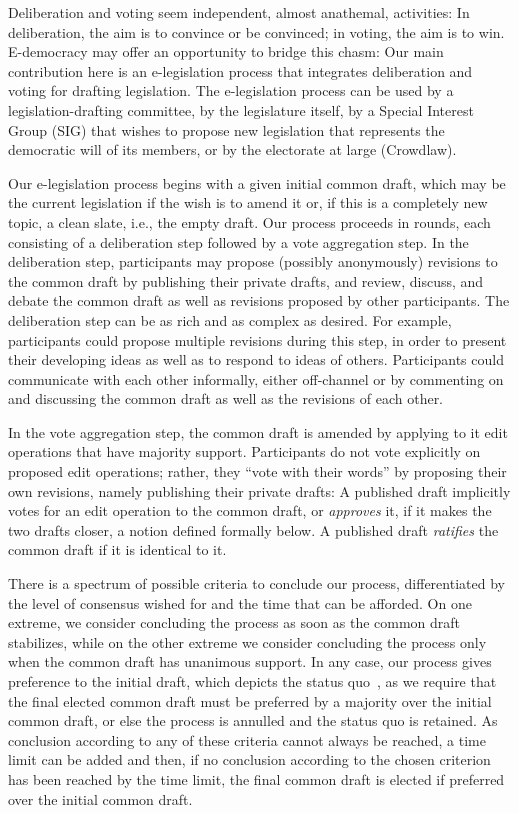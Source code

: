 \documentclass{llncs}
\begin{document}
Deliberation and voting seem independent, almost anathemal, activities: In deliberation, the aim is to convince or be convinced; in voting, the aim is to win.  E-democracy may offer an opportunity to bridge this chasm: Our main contribution here is an e-legislation process that integrates deliberation and voting for drafting legislation. The e-legislation process can be used by a legislation-drafting committee, by the legislature itself, by a Special Interest Group (SIG) that wishes to propose new legislation that represents the democratic will of its members, or by the electorate at large (Crowdlaw).

Our e-legislation process begins with a given initial common draft, which may be the current legislation if the wish is to amend it or, if this is a completely new topic, a clean slate, i.e., the empty draft.  Our process proceeds in rounds, each consisting of a deliberation step followed by a vote aggregation step. In the deliberation step,
participants may propose (possibly anonymously) revisions to the common draft by publishing their private drafts,  and review, discuss, and debate the common draft as well as revisions proposed by other participants. The deliberation step can be as rich and as complex as desired. For example, participants could propose multiple revisions during this step, in order to present their developing ideas as well as to respond to ideas of others. Participants could communicate with each other informally, either off-channel or by commenting on and discussing the common draft as well as the revisions of each other. 

In the vote aggregation step, the common draft is amended by applying to it edit operations that have majority support. Participants do not vote explicitly on proposed edit operations; rather, they ``vote with their words'' by proposing their own revisions, namely publishing their private drafts:  A published draft implicitly votes for an edit operation to the common draft, or \emph{approves} it, if it makes the two drafts closer, a notion defined formally below.  A published draft \emph{ratifies} the common draft if it is identical to it.

There is a spectrum of possible criteria to conclude our process, differentiated by the level of consensus wished for and the time that can be afforded. On one extreme, we consider concluding the process as soon as the common draft stabilizes, while on the other extreme we consider concluding the process only when the common draft has unanimous support. In any case, our process gives preference to the initial draft, which depicts the status quo~\cite{realsoc}, as we require that the final elected common draft must be preferred by a majority over the initial common draft, or else the process is annulled and the status quo is retained.
As conclusion according to any of these criteria cannot always be reached, a time limit can be added and then, if no conclusion according to the chosen criterion has been reached by the time limit, the final common draft is elected if preferred over the initial common draft.
\end{document}
